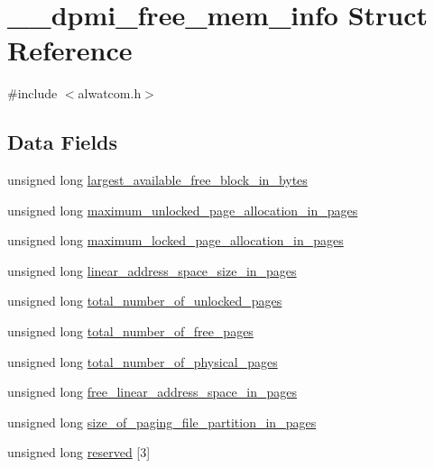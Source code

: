 \hypertarget{struct____dpmi__free__mem__info}{}\section{\+\_\+\+\_\+dpmi\+\_\+free\+\_\+mem\+\_\+info Struct Reference}
\label{struct____dpmi__free__mem__info}


{\ttfamily \#include $<$alwatcom.\+h$>$}

\subsection*{Data Fields}
\begin{DoxyCompactItemize}
\item 
unsigned long \hyperlink{struct____dpmi__free__mem__info_a4da247aa69dab08adb13ac005543f723}{largest\+\_\+available\+\_\+free\+\_\+block\+\_\+in\+\_\+bytes}
\item 
unsigned long \hyperlink{struct____dpmi__free__mem__info_a55c6ee34b904e1db2d7b71957f1e4ff2}{maximum\+\_\+unlocked\+\_\+page\+\_\+allocation\+\_\+in\+\_\+pages}
\item 
unsigned long \hyperlink{struct____dpmi__free__mem__info_a8f002b2a10e54e97fe9579fe59ce5329}{maximum\+\_\+locked\+\_\+page\+\_\+allocation\+\_\+in\+\_\+pages}
\item 
unsigned long \hyperlink{struct____dpmi__free__mem__info_aa13eca3174ef1e50a6b322bce56430ff}{linear\+\_\+address\+\_\+space\+\_\+size\+\_\+in\+\_\+pages}
\item 
unsigned long \hyperlink{struct____dpmi__free__mem__info_a093d5697da361c1b37c6a8e223590474}{total\+\_\+number\+\_\+of\+\_\+unlocked\+\_\+pages}
\item 
unsigned long \hyperlink{struct____dpmi__free__mem__info_ab1c327c4b089e0faed954a5cf74deca3}{total\+\_\+number\+\_\+of\+\_\+free\+\_\+pages}
\item 
unsigned long \hyperlink{struct____dpmi__free__mem__info_a1465b8d1474e5967f881dfae3b1bb168}{total\+\_\+number\+\_\+of\+\_\+physical\+\_\+pages}
\item 
unsigned long \hyperlink{struct____dpmi__free__mem__info_a9706d55f8126e6cc81357b321291f4cc}{free\+\_\+linear\+\_\+address\+\_\+space\+\_\+in\+\_\+pages}
\item 
unsigned long \hyperlink{struct____dpmi__free__mem__info_aa57ec98622bb71ef6b06ce371df9e00b}{size\+\_\+of\+\_\+paging\+\_\+file\+\_\+partition\+\_\+in\+\_\+pages}
\item 
unsigned long \hyperlink{struct____dpmi__free__mem__info_a078134c763676a8c25b46b9fd29464ff}{reserved} \mbox{[}3\mbox{]}
\end{DoxyCompactItemize}


